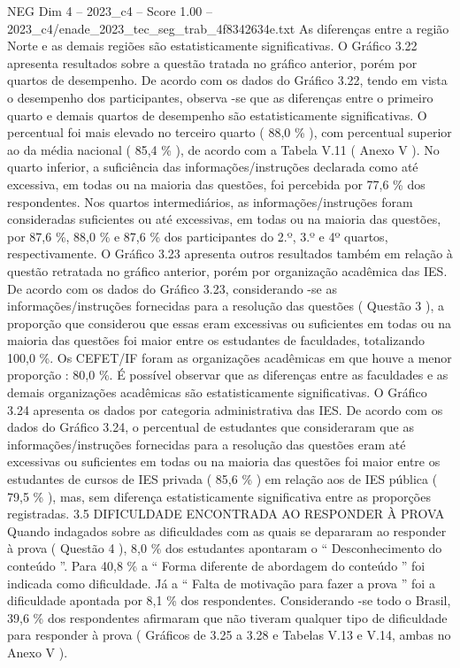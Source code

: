 \begin{textsample}{NEG Dim 4 – 2023\_c4 – Score 1.00 – 2023\_c4/enade\_2023\_tec\_seg\_trab\_4f8342634e.txt}
As diferenças entre a região Norte e as demais regiões são estatisticamente significativas.
O Gráfico 3.22 apresenta resultados sobre a questão tratada no gráfico anterior, porém por quartos de desempenho.
De acordo com os dados do Gráfico 3.22, tendo em vista o desempenho dos participantes, observa -se que as diferenças entre o primeiro quarto e demais quartos de desempenho são estatisticamente significativas.
O percentual foi mais elevado no terceiro quarto ( 88,0 \% ), com percentual superior ao da média nacional ( 85,4 \% ), de acordo com a Tabela V.11 ( Anexo V ).
No quarto inferior, a suficiência das informações/instruções declarada como até excessiva, em todas ou na maioria das questões, foi percebida por 77,6 \% dos respondentes.
Nos quartos intermediários, as informações/instruções foram consideradas suficientes ou até excessivas, em todas ou na maioria das questões, por 87,6 \%, 88,0 \% e 87,6 \% dos participantes do 2.º, 3.º e 4º quartos, respectivamente.
O Gráfico 3.23 apresenta outros resultados também em relação à questão retratada no gráfico anterior, porém por organização acadêmica das IES.
De acordo com os dados do Gráfico 3.23, considerando -se as informações/instruções fornecidas para a resolução das questões ( Questão 3 ), a proporção que considerou que essas eram excessivas ou suficientes em todas ou na maioria das questões foi maior entre os estudantes de faculdades, totalizando 100,0 \%.
Os CEFET/IF foram as organizações acadêmicas em que houve a menor proporção : 80,0 \%.
É possível observar que as diferenças entre as faculdades e as demais organizações acadêmicas são estatisticamente significativas.
O Gráfico 3.24 apresenta os dados por categoria administrativa das IES.
De acordo com os dados do Gráfico 3.24, o percentual de estudantes que consideraram que as informações/instruções fornecidas para a resolução das questões eram até excessivas ou suficientes em todas ou na maioria das questões foi maior entre os estudantes de cursos de IES privada ( 85,6 \% ) em relação aos de IES pública ( 79,5 \% ), mas, sem diferença estatisticamente significativa entre as proporções registradas. 3.5 DIFICULDADE ENCONTRADA AO RESPONDER À PROVA Quando indagados sobre as dificuldades com as quais se depararam ao responder à prova ( Questão 4 ), 8,0 \% dos estudantes apontaram o “ Desconhecimento do conteúdo ”.
Para 40,8 \% a “ Forma diferente de abordagem do conteúdo ” foi indicada como dificuldade.
Já a “ Falta de motivação para fazer a prova ” foi a dificuldade apontada por 8,1 \% dos respondentes.
Considerando -se todo o Brasil, 39,6 \% dos respondentes afirmaram que não tiveram qualquer tipo de dificuldade para responder à prova ( Gráficos de 3.25 a 3.28 e Tabelas V.13 e V.14, ambas no Anexo V ).

\end{textsample}
